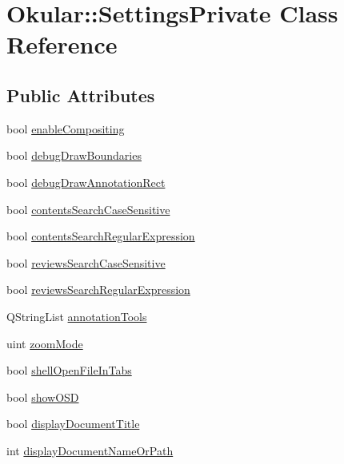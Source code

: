 \hypertarget{classOkular_1_1SettingsPrivate}{\section{Okular\+:\+:Settings\+Private Class Reference}
\label{classOkular_1_1SettingsPrivate}
}
\subsection*{Public Attributes}
\begin{DoxyCompactItemize}
\item 
bool \hyperlink{classOkular_1_1SettingsPrivate_abe6f51bb5f2d64f130073b20104b3cf7}{enable\+Compositing}
\item 
bool \hyperlink{classOkular_1_1SettingsPrivate_a9966867211ca301a2d11f3016a9db3ca}{debug\+Draw\+Boundaries}
\item 
bool \hyperlink{classOkular_1_1SettingsPrivate_a040f796657dfe0905ed71b629e9b9009}{debug\+Draw\+Annotation\+Rect}
\item 
bool \hyperlink{classOkular_1_1SettingsPrivate_ae9050bcbbf06beab63c6a46fe7e9273b}{contents\+Search\+Case\+Sensitive}
\item 
bool \hyperlink{classOkular_1_1SettingsPrivate_a40bd9f8a34c27f1fdd6b215fda767d44}{contents\+Search\+Regular\+Expression}
\item 
bool \hyperlink{classOkular_1_1SettingsPrivate_af7f4aa7572b8bc8a6a23c9b25785cfe0}{reviews\+Search\+Case\+Sensitive}
\item 
bool \hyperlink{classOkular_1_1SettingsPrivate_a9d9e9251e0bf18a0bdc3ca726c884012}{reviews\+Search\+Regular\+Expression}
\item 
Q\+String\+List \hyperlink{classOkular_1_1SettingsPrivate_a8101a5e16abef42c29ad8a4459f9f62e}{annotation\+Tools}
\item 
uint \hyperlink{classOkular_1_1SettingsPrivate_a6dcb996680cc0053eb1acf6bb98f05c8}{zoom\+Mode}
\item 
bool \hyperlink{classOkular_1_1SettingsPrivate_ac73c4b9cc99b0dc6db98a6904d7640c9}{shell\+Open\+File\+In\+Tabs}
\item 
bool \hyperlink{classOkular_1_1SettingsPrivate_a345bba4c3b0a87f52cb0b01dc023c754}{show\+O\+S\+D}
\item 
bool \hyperlink{classOkular_1_1SettingsPrivate_a6a8c4abf8094c77e469831b6e0d4b2ea}{display\+Document\+Title}
\item 
int \hyperlink{classOkular_1_1SettingsPrivate_a3f6c60aec6fe2cc4acf6d21382d57abf}{display\+Document\+Name\+Or\+Path}

\end{DoxyCompactItemize}
